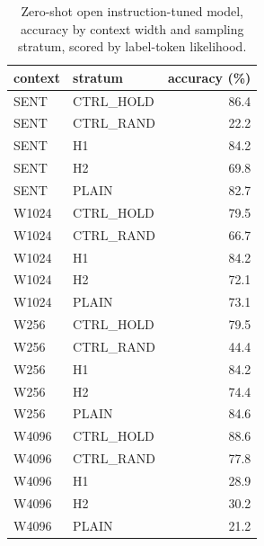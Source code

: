 \begin{table}[t]
\centering\small
\begin{tabular}{llr}
\toprule
context & stratum & accuracy (\%) \\
\midrule
SENT & CTRL\_HOLD & 86.4 \\
SENT & CTRL\_RAND & 22.2 \\
SENT & H1 & 84.2 \\
SENT & H2 & 69.8 \\
SENT & PLAIN & 82.7 \\
W1024 & CTRL\_HOLD & 79.5 \\
W1024 & CTRL\_RAND & 66.7 \\
W1024 & H1 & 84.2 \\
W1024 & H2 & 72.1 \\
W1024 & PLAIN & 73.1 \\
W256 & CTRL\_HOLD & 79.5 \\
W256 & CTRL\_RAND & 44.4 \\
W256 & H1 & 84.2 \\
W256 & H2 & 74.4 \\
W256 & PLAIN & 84.6 \\
W4096 & CTRL\_HOLD & 88.6 \\
W4096 & CTRL\_RAND & 77.8 \\
W4096 & H1 & 28.9 \\
W4096 & H2 & 30.2 \\
W4096 & PLAIN & 21.2 \\
\bottomrule
\end{tabular}
\caption{Zero-shot open instruction-tuned model, accuracy by context width and sampling stratum, scored by label-token likelihood.}
\label{tab:llmstratum}
\end{table}
